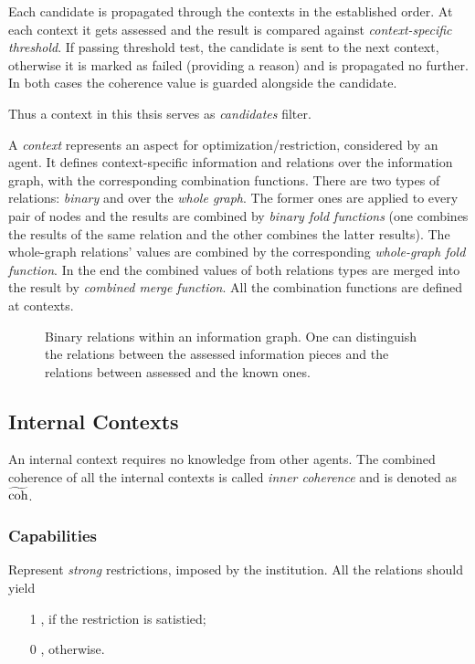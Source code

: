 Each candidate is propagated through the contexts in the established
order. At each context it gets assessed and the result is compared
against \emph{context-specific threshold}. If passing threshold test,
the candidate is sent to the next context, otherwise it is marked as failed
(providing a reason) and is propagated no further. In both cases the coherence
value is guarded alongside the candidate.

Thus a context in this thsis serves as \emph{candidates} filter.
\medskip

\noindent
A \emph{context} represents an aspect for optimization/restriction, considered
by an agent. It defines context-specific information and relations over the
information graph, with the corresponding combination functions. There are
two types of relations: \emph{binary} and over the \emph{whole graph}. The former ones
are applied to every pair of nodes and the results are combined by
\emph{binary fold functions} (one combines the results of the same relation
and the other combines the latter results). The whole-graph relations' values are
combined by the corresponding \emph{whole-graph fold function}. In the end the
combined values of both relations types are merged into the result by
\emph{combined merge function}. All the combination functions are defined at
contexts.

\begin{figure}[h]
  \centering
  \fbox{  }
  \caption{Binary relations within an information graph. One can
           distinguish the relations between the assessed information pieces
           and the relations between assessed and the known ones.
          }
\end{figure}


\subsection{Internal Contexts}

An internal context requires no knowledge from other agents.
The combined coherence of all the internal contexts is called
\emph{inner coherence} and is denoted as $\mathrm{\widetilde{coh}}$.

\subsubsection{Capabilities}

Represent \emph{strong} restrictions, imposed by the institution.
All the relations should yield
\begin{itemize}
  \item [1], if the restriction is satistied;
  \item [0], otherwise.
\end{itemize}

